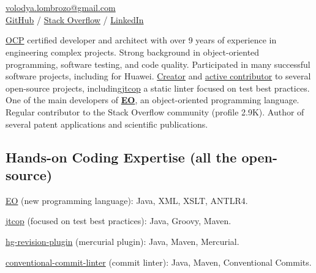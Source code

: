 \documentclass{vl}
\begin{document}
    \vlPrintPhoto{}

    \section*{\Large {}}

    \href{mailto:volodya.lombrozo@gmail.com}{volodya.lombrozo@gmail.com}\\%
    \href{https://github.com/volodya-lombrozo}{GitHub} /
    \href{https://stackoverflow.com/users/10423604/volodya-lombrozo}{Stack Overflow} /
    \href{https://www.linkedin.com/in/vladimir-zakharov-lombrozo-b71744216/}{LinkedIn}

    \vspace*{12pt}

    \href{https://catalog-education.oracle.com/pls/certview/sharebadge?id=87F6A2FE819A5A5AF4120A05900AB28A461EE9A3EE9FBFA02721FADAEB3BCE19}{OCP}
    certified developer and architect with over 9 years of experience in engineering complex projects.
    Strong background in object-oriented programming, software testing, and code quality.
    Participated in many successful software projects, including for Huawei.
    \href{https://github.com/volodya-lombrozo?tab=repositories}{Creator} and
    \href{https://github.com/volodya-lombrozo}{active contributor} to several open-source projects,
    including\href{https://github.com/volodya-lombrozo/jtcop}{jtcop} a static linter focused on test best practices.
    One of the main developers of \textbf{\href{https://www.eolang.org}{EO}}, an object-oriented programming language.
    Regular contributor to the Stack Overflow community (profile 2.9K).
    Author of several patent applications and scientific publications.

    \subsection*{Hands-on Coding Expertise (all the open-source)}

    \href{https://www.eolang.org}{EO} (new programming language):
    Java, XML, XSLT, ANTLR4.

    \href{https://github.com/volodya-lombrozo/jtcop}{jtcop} (focused on test best practices):
    Java, Groovy, Maven.

    \href{https://github.com/volodya-lombrozo/hg-revision-plugin}{hg-revision-plugin} (mercurial plugin):
    Java, Maven, Mercurial.

    \href{https://github.com/volodya-lombrozo/conventional-commit-linter}{conventional-commit-linter} (commit linter):
    Java, Maven, Conventional Commits.
\end{document}
